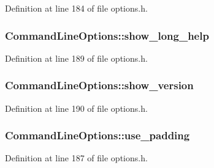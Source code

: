 Definition at line 184 of file options.\+h.

\subsubsection[{\texorpdfstring{show\+\_\+long\+\_\+help}{show_long_help}}]{ Command\+Line\+Options\+::show\+\_\+long\+\_\+help}\hypertarget{struct_command_line_options_a446f5389fefc4ef51ebff657b51c04c6}{}\label{struct_command_line_options_a446f5389fefc4ef51ebff657b51c04c6}


Definition at line 189 of file options.\+h.

\subsubsection[{\texorpdfstring{show\+\_\+version}{show_version}}]{ Command\+Line\+Options\+::show\+\_\+version}\hypertarget{struct_command_line_options_a5cf36cf06365b75a75eeb7b8c03a8800}{}\label{struct_command_line_options_a5cf36cf06365b75a75eeb7b8c03a8800}


Definition at line 190 of file options.\+h.

\subsubsection[{\texorpdfstring{use\+\_\+padding}{use_padding}}]{ Command\+Line\+Options\+::use\+\_\+padding}\hypertarget{struct_command_line_options_affd978b1a0bece3d9bf35fdc1550280e}{}\label{struct_command_line_options_affd978b1a0bece3d9bf35fdc1550280e}


Definition at line 187 of file options.\+h.

